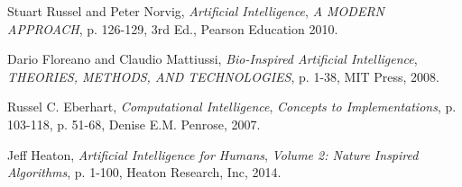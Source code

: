 \documentclass[a4paper, 12pt, titlepage]{article}
\begin{document}
\begin{thebibliography}{9}

  
  Stuart Russel and Peter Norvig,
  \textit{Artificial Intelligence},
  \textit{A MODERN APPROACH},
  p. 126-129, 
  3rd Ed., 
  Pearson Education
  2010.

  Dario Floreano and Claudio Mattiussi,
  \textit{Bio-Inspired Artificial Intelligence},
  \textit{THEORIES, METHODS, AND TECHNOLOGIES},
  p. 1-38,
  MIT Press,
  2008.

  Russel C. Eberhart,
  \textit{Computational Intelligence},
  \textit{Concepts to Implementations},
  p. 103-118,
  p. 51-68,
  Denise E.M. Penrose,
  2007.

  Jeff Heaton,
  \textit{Artificial Intelligence for Humans},
  \textit{Volume 2: Nature Inspired Algorithms},
  p. 1-100,
  Heaton Research, Inc,
  2014.

\end{thebibliography}
\end{document}
